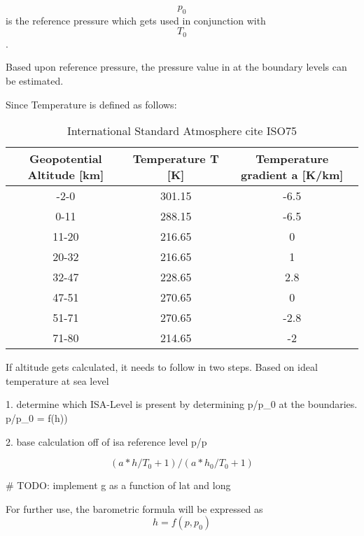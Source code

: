 $$p_0$$ is the reference pressure which gets used in conjunction with $$T_0$$.

Based upon reference pressure, the pressure value in at the boundary levels can be estimated.

Since Temperature is defined as follows:


\begin{table}[]
        \begin{tabular}{ccc}
            \toprule
            Geopotential Altitude [km] & Temperature T [K] & Temperature gradient a [K/km] \\ \midrule
            -2-0                       & 301.15            & -6.5                          \\
            0-11                       & 288.15            & -6.5                          \\
            11-20                      & 216.65            & 0                             \\
            20-32                      & 216.65            & 1                             \\
            32-47                      & 228.65            & 2.8                           \\
            47-51                      & 270.65            & 0                             \\
            51-71                      & 270.65            & -2.8                          \\
            71-80                      & 214.65            & -2                            \\ \bottomrule
        \end{tabular}
\caption{International Standard Atmosphere cite ISO75}
    \label{tab:isa_temp}
\end{table}


If altitude gets calculated, it needs to follow in two steps.
Based on ideal temperature at sea level

1. determine which ISA-Level is present by determining p/p_0 at the boundaries.
p/p_0 = f(h))


2. base calculation off of isa reference level
p/p

$$(a*h/T_0+1)/(a*h_0/T_0+1)$$

# TODO: implement g as a function of lat and long



For further use, the barometric formula will be expressed as  $$h = f(p,p_0)$$


